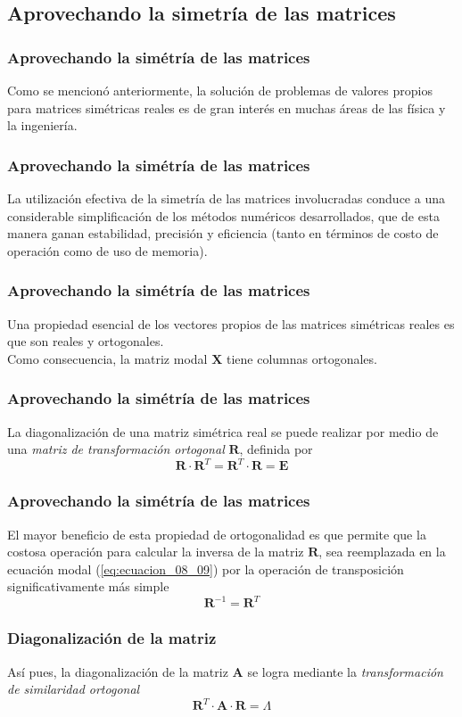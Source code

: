 \subsection{Aprovechando la simetría de las matrices}
\begin{frame}
\frametitle{Aprovechando la simétría de las matrices}
Como se mencionó anteriormente, la solución de problemas de valores propios para matrices simétricas reales es de gran interés en muchas áreas de las física y la ingeniería.
\end{frame}
\begin{frame}
\frametitle{Aprovechando la simétría de las matrices}
La utilización efectiva de la simetría de las matrices involucradas conduce a una considerable simplificación de los métodos numéricos desarrollados, que de esta manera ganan estabilidad, precisión y eficiencia (tanto en términos de costo de operación como de uso de memoria).
\end{frame}
\begin{frame}
\frametitle{Aprovechando la simétría de las matrices}
Una propiedad esencial de los vectores propios de las matrices simétricas reales es que son reales y ortogonales.
\\
\bigskip
Como consecuencia, la matriz modal $\mathbf{X}$ tiene columnas ortogonales.
\end{frame}
\begin{frame}
\frametitle{Aprovechando la simétría de las matrices}
La diagonalización de una matriz simétrica real se puede realizar por medio de una \emph{matriz de transformación ortogonal} $\mathbf{R}$, definida por
\[ \mathbf{R} \cdot \mathbf{R}^{T} =  \mathbf{R}^{T} \cdot \mathbf{R} =  \mathbf{E} \]
\end{frame}
\begin{frame}
\frametitle{Aprovechando la simétría de las matrices}
El mayor beneficio de esta propiedad de ortogonalidad es que permite que la costosa operación para calcular la inversa de la matriz $\mathbf{R}$, sea reemplazada en la ecuación modal (\ref{eq:ecuacion_08_09}) por la operación de transposición significativamente más simple
\[ \mathbf{R}^{-1} =  \mathbf{R}^{T} \]
\end{frame}
\begin{frame}
\frametitle{Diagonalización de la matriz}
Así pues, la diagonalización de la matriz $\mathbf{A}$ se logra mediante la \emph{transformación de similaridad ortogonal}
\begin{equation}
\mathbf{R}^{T} \cdot \mathbf{A} \cdot \mathbf{R} = \Lambda
\label{eq:ecuacion_08_13}
\end{equation}
\end{frame}

